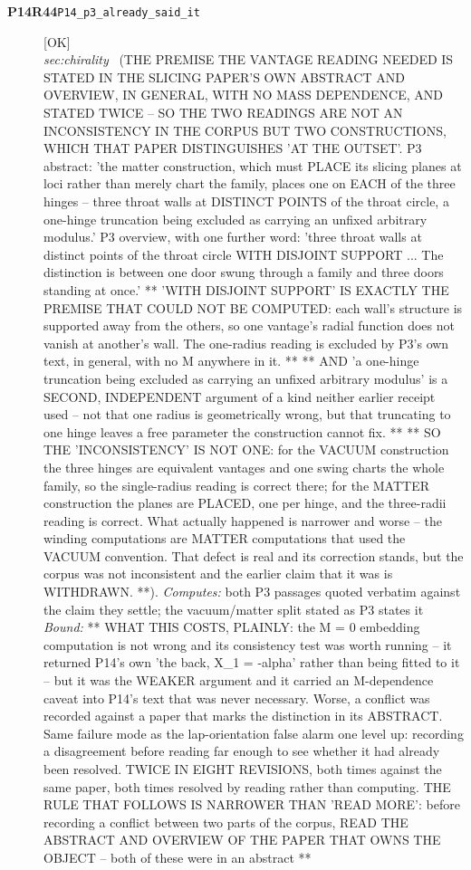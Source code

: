 \begin{description}
\item[\textbf{P14R44}\quad\texttt{P14\_p3\_already\_said\_it}]\hfill\textsf{[OK]}\\
\textit{sec:chirality} \ (THE PREMISE THE VANTAGE READING NEEDED IS STATED IN THE SLICING PAPER'S OWN ABSTRACT AND OVERVIEW, IN GENERAL, WITH NO MASS DEPENDENCE, AND STATED TWICE -- SO THE TWO READINGS ARE NOT AN INCONSISTENCY IN THE CORPUS BUT TWO CONSTRUCTIONS, WHICH THAT PAPER DISTINGUISHES 'AT THE OUTSET'. P3 abstract: 'the matter construction, which must PLACE its slicing planes at loci rather than merely chart the family, places one on EACH of the three hinges -- three throat walls at DISTINCT POINTS of the throat circle, a one-hinge truncation being excluded as carrying an unfixed arbitrary modulus.' P3 overview, with one further word: 'three throat walls at distinct points of the throat circle WITH DISJOINT SUPPORT ... The distinction is between one door swung through a family and three doors standing at once.' ** 'WITH DISJOINT SUPPORT' IS EXACTLY THE PREMISE THAT COULD NOT BE COMPUTED: each wall's structure is supported away from the others, so one vantage's radial function does not vanish at another's wall. The one-radius reading is excluded by P3's own text, in general, with no M anywhere in it. ** ** AND 'a one-hinge truncation being excluded as carrying an unfixed arbitrary modulus' is a SECOND, INDEPENDENT argument of a kind neither earlier receipt used -- not that one radius is geometrically wrong, but that truncating to one hinge leaves a free parameter the construction cannot fix. ** ** SO THE 'INCONSISTENCY' IS NOT ONE: for the VACUUM construction the three hinges are equivalent vantages and one swing charts the whole family, so the single-radius reading is correct there; for the MATTER construction the planes are PLACED, one per hinge, and the three-radii reading is correct. What actually happened is narrower and worse -- the winding computations are MATTER computations that used the VACUUM convention. That defect is real and its correction stands, but the corpus was not inconsistent and the earlier claim that it was is WITHDRAWN. **). 
\emph{Computes:} both P3 passages quoted verbatim against the claim they settle; the vacuum/matter split stated as P3 states it
 \emph{Bound:} ** WHAT THIS COSTS, PLAINLY: the M = 0 embedding computation is not wrong and its consistency test was worth running -- it returned P14's own 'the back, X\_1 = -alpha' rather than being fitted to it -- but it was the WEAKER argument and it carried an M-dependence caveat into P14's text that was never necessary. Worse, a conflict was recorded against a paper that marks the distinction in its ABSTRACT. Same failure mode as the lap-orientation false alarm one level up: recording a disagreement before reading far enough to see whether it had already been resolved. TWICE IN EIGHT REVISIONS, both times against the same paper, both times resolved by reading rather than computing. THE RULE THAT FOLLOWS IS NARROWER THAN 'READ MORE': before recording a conflict between two parts of the corpus, READ THE ABSTRACT AND OVERVIEW OF THE PAPER THAT OWNS THE OBJECT -- both of these were in an abstract **

\end{description}
